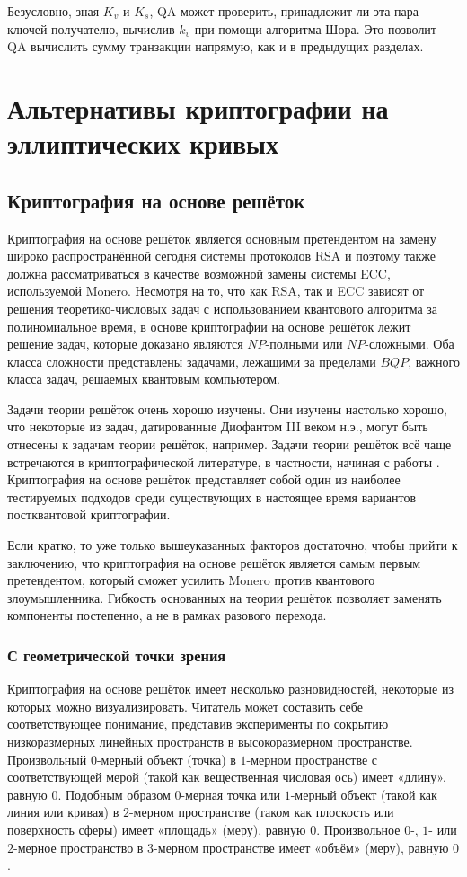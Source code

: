 \documentclass{mrl}
\begin{document}
Безусловно, зная $K_v$ и $K_s$, QA может проверить, принадлежит ли эта пара ключей получателю, вычислив $k_v$ при помощи алгоритма Шора. Это позволит QA вычислить сумму транзакции напрямую, как и в предыдущих разделах.

\section{Альтернативы криптографии на эллиптических кривых}

\subsection{Криптография на основе решёток}

Криптография на основе решёток является основным претендентом на замену широко распространённой сегодня системы протоколов RSA и поэтому также должна рассматриваться в качестве возможной замены системы ECC, используемой Monero. Несмотря на то, что как RSA, так и ECC зависят от решения теоретико-числовых задач с использованием квантового алгоритма за полиномиальное время, в основе криптографии на основе решёток лежит решение задач, которые доказано являются $NP$-полными или $NP$-сложными. Оба класса сложности представлены задачами, лежащими за пределами $BQP$, важного класса задач, решаемых квантовым компьютером.

Задачи теории решёток очень хорошо изучены. Они изучены настолько хорошо, что некоторые из задач, датированные Диофантом III веком н.э., могут быть отнесены к задачам теории решёток, например. Задачи теории решёток всё чаще встречаются в криптографической литературе, в частности, начиная с работы \cite{Shor1994algorithms}. Криптография на основе решёток представляет собой один из наиболее тестируемых подходов среди существующих в настоящее время вариантов постквантовой криптографии.

Если кратко, то уже только вышеуказанных факторов достаточно, чтобы прийти к заключению, что криптография на основе решёток является самым первым претендентом, который сможет усилить Monero против квантового злоумышленника. Гибкость основанных на теории решёток позволяет заменять компоненты постепенно, а не в рамках разового перехода.

\subsubsection{С геометрической точки зрения}

Криптография на основе решёток имеет несколько разновидностей, некоторые из которых можно визуализировать. Читатель может составить себе соответствующее понимание, представив эксперименты по сокрытию низкоразмерных линейных пространств в высокоразмерном пространстве. Произвольный $0$-мерный объект (точка) в $1$-мерном пространстве с соответствующей мерой (такой как вещественная числовая ось) имеет «длину», равную $0$. Подобным образом $0$-мерная точка или $1$-мерный объект (такой как линия или кривая) в $2$-мерном пространстве (таком как плоскость или поверхность сферы) имеет «площадь» (меру), равную $0$. Произвольное $0$-, $1$- или $2$-мерное пространство в $3$-мерном пространстве имеет «объём» (меру), равную $0$.
\end{document}
